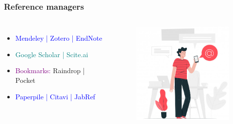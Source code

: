\documentclass[newPxFont,sthlmFooter]{beamer}
\newcommand{\fs}{\footnotesize}
\begin{document}
\begin{frame}\frametitle{Reference managers}
  \begin{columns}[T,onlytextwidth]
      \vspace{1.5cm}
  \begin{itemize}
    \fs
	\item \textcolor{blue}{Mendeley | Zotero | EndNote}
	\item \textcolor{teal}{Google Scholar | Scite.ai}
	\item \textcolor{purple}{Bookmarks:} Raindrop | Pocket
	\item \textcolor{blue}{Paperpile | Citavi | JabRef}
  \end{itemize}
        \vspace{0.5cm}
              \vspace{-0.5cm}
  \begin{figure}
    \centering
    \includegraphics[width=2in]{figs/ref} 
  \end{figure}
  \end{columns}
\end{frame}
\end{document}
